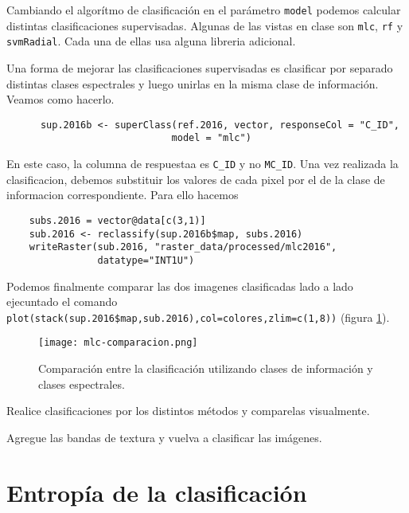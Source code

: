 Cambiando el algor\'itmo de clasificaci\'on en el par\'ametro \texttt{model} podemos calcular distintas clasificaciones supervisadas. Algunas de las vistas en clase son \texttt{mlc}, \texttt{rf} y \texttt{svmRadial}. Cada una de ellas usa alguna libreria adicional.

\begin{exa}
  Una forma de mejorar las clasificaciones supervisadas es clasificar por separado distintas clases espectrales y luego unirlas en la misma clase de informaci\'on. Veamos como hacerlo.

  \begin{lstlisting}
      sup.2016b <- superClass(ref.2016, vector, responseCol = "C_ID",
                             model = "mlc")
  \end{lstlisting}

  En este caso, la columna de respuestaa es \texttt{C\_ID} y no \texttt{MC\_ID}.  Una vez realizada la clasificacion, debemos substituir los valores de cada pixel por el de la clase de informacion correspondiente. Para ello hacemos

  \begin{lstlisting}
    subs.2016 = vector@data[c(3,1)]
    sub.2016 <- reclassify(sup.2016b$map, subs.2016)
    writeRaster(sub.2016, "raster_data/processed/mlc2016",
                datatype="INT1U")
  \end{lstlisting}

    Podemos finalmente comparar las dos imagenes clasificadas lado a lado ejecuntado el comando \verb|plot(stack(sup.2016$map,sub.2016),col=colores,zlim=c(1,8))| (figura \ref{fig:mlc}).

    \begin{figure}[h!]
      \centering
      \texttt{[image: mlc-comparacion.png]}
      \caption{Comparaci\'on entre la clasificaci\'on utilizando clases de informaci\'on y clases espectrales.}
      \label{fig:mlc}
    \end{figure}
\end{exa}

\begin{act}
    Realice clasificaciones por los distintos m\'etodos y comparelas visualmente.
\end{act}

\begin{act}
    Agregue las bandas de textura y vuelva a clasificar las im\'agenes.
\end{act}

\section{Entrop\'ia de la clasificaci\'on}

